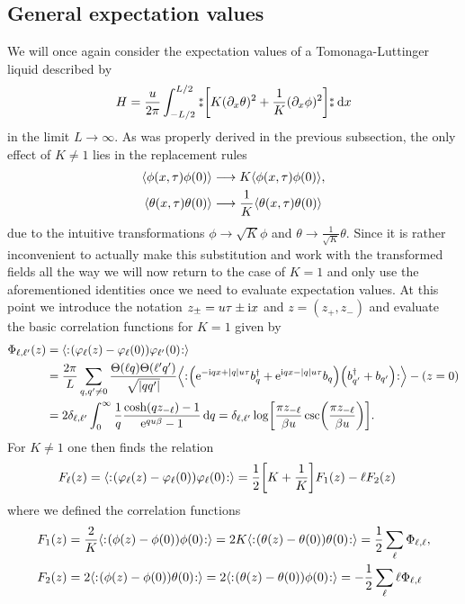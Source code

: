 \documentclass[english, parskip=full]{scrartcl}
\begin{document}
\subsection{General expectation values}
We will once again consider the expectation values of a Tomonaga-Luttinger liquid described by
\begin{align}
H = \frac{u}{2\pi} \intx{-L/2}{L/2}{\varnormord{\klb*{K(\partial_x\theta)^2 + \frac{1}{K} (\partial_x\phi)^2}}}{x}
\end{align}
in the limit $L\rightarrow \infty$.
As was properly derived in the previous subsection, the only effect of $K\neq 1$ lies in the replacement rules
\begin{align}
\bra*{\phi(x,\tau)\phi(0)}&\longrightarrow K\bra*{\phi(x,\tau)\phi(0)},\\
\bra*{\theta(x,\tau)\theta(0)}&\longrightarrow \frac{1}{K}\bra*{\theta(x,\tau)\theta(0)}
\end{align}
due to the intuitive transformations $\phi \rightarrow \sqrt{K} \phi$ and $\theta \rightarrow \frac{1}{\sqrt{K}} \theta$.
Since it is rather inconvenient to actually make this substitution and work with the transformed fields all the way we will now return to the case of $K=1$ and only use the aforementioned identities once we need to evaluate expectation values.
At this point we introduce the notation $z_\pm = u\tau \pm \text{i} x$ and $z = (z_+,z_-)$ and evaluate the basic correlation functions for $K=1$ given by
\begin{align}
\Phi_{\ell,\ell'}(z) &= \bra*{\normord{\kla*{\varphi_\ell(z) - \varphi_\ell(0)} \varphi_{\ell'}(0)}}\\
&= \frac{2\pi}{L} \sum_{q,q'\neq 0} \frac{\Theta(\ell q) \Theta(\ell' q')}{\sqrt{|qq'|}} \bra*{\normord{ \kla*{\powe{-\i qx + |q|u\tau} b_q^\dagger + \powe{\i qx - |q|u\tau} b_q} \kla*{b_{q'}^\dagger + b_{q'}} }} - \kla*{z=0}\\
&= 2\delta_{\ell,\ell'} \intx{0}{\infty}{\frac{1}{q} \frac{\cosh\kla*{qz_{-\ell}} - 1}{\powe{qu\beta} - 1}}{q} = \delta_{\ell,\ell'} \log\klb*{\frac{\pi z_{-\ell}}{\beta u} \csc\kla*{\frac{\pi z_{-\ell}}{\beta u}}}.
\end{align}
For $K\neq 1$ one then finds the relation
\begin{align}
F_\ell(z) &= \bra*{\normord{\kla*{\varphi_\ell(z) - \varphi_\ell(0)} \varphi_\ell(0)}} = \frac{1}{2}\klb*{K + \frac{1}{K}} F_1(z) - \ell F_2(z)
\end{align}
where we defined the correlation functions
\begin{align}
F_1(z) &= \frac{2}{K}\bra*{\normord{\kla*{\phi(z) - \phi(0)} \phi(0)}} = 2K\bra*{\normord{\kla*{\theta(z) - \theta(0)} \theta(0)}} = \frac{1}{2} \sum_\ell \Phi_{\ell,\ell},\\
F_2(z) &= 2\bra*{\normord{\kla*{\phi(z) - \phi(0)} \theta(0)}} = 2\bra*{\normord{\kla*{\theta(z) - \theta(0)} \phi(0)}} = -\frac{1}{2}\sum_\ell \ell \Phi_{\ell,\ell}
\end{align}
\end{document}

